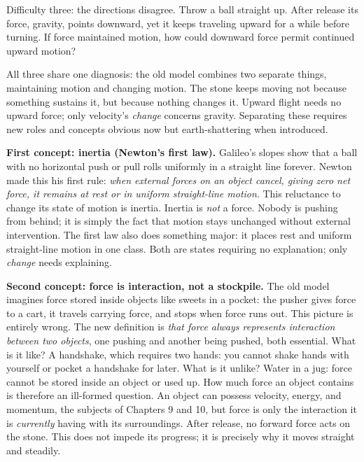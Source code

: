 Difficulty three: the directions disagree. Throw a ball straight up. After release its force, gravity, points downward, yet it keeps traveling upward for a while before turning. If force maintained motion, how could downward force permit continued upward motion?

All three share one diagnosis: the old model combines two separate things, maintaining motion and changing motion. The stone keeps moving not because something sustains it, but because nothing changes it. Upward flight needs no upward force; only velocity's \emph{change} concerns gravity. Separating these requires new roles and concepts obvious now but earth-shattering when introduced.


\begin{mainline}
\textbf{First concept: inertia (Newton's first law).} Galileo's slopes show that a ball with no horizontal push or pull rolls uniformly in a straight line forever. Newton made this his first rule: \emph{when external forces on an object cancel, giving zero net force, it remains at rest or in uniform straight-line motion}. This reluctance to change its state of motion is inertia. Inertia is \emph{not} a force. Nobody is pushing from behind; it is simply the fact that motion stays unchanged without external intervention. The first law also does something major: it places rest and uniform straight-line motion in one class. Both are states requiring no explanation; only \emph{change} needs explaining.

\textbf{Second concept: force is interaction, not a stockpile.} The old model imagines force stored inside objects like sweets in a pocket: the pusher gives force to a cart, it travels carrying force, and stops when force runs out. This picture is entirely wrong. The new definition is \emph{that force always represents interaction between two objects}, one pushing and another being pushed, both essential. What is it like? A handshake, which requires two hands: you cannot shake hands with yourself or pocket a handshake for later. What is it unlike? Water in a jug: force cannot be stored inside an object or used up. How much force an object contains is therefore an ill-formed question. An object can possess velocity, energy, and momentum, the subjects of Chapters 9 and 10, but force is only the interaction it is \emph{currently} having with its surroundings. After release, no forward force acts on the stone. This does not impede its progress; it is precisely why it moves straight and steadily.


\end{mainline}
